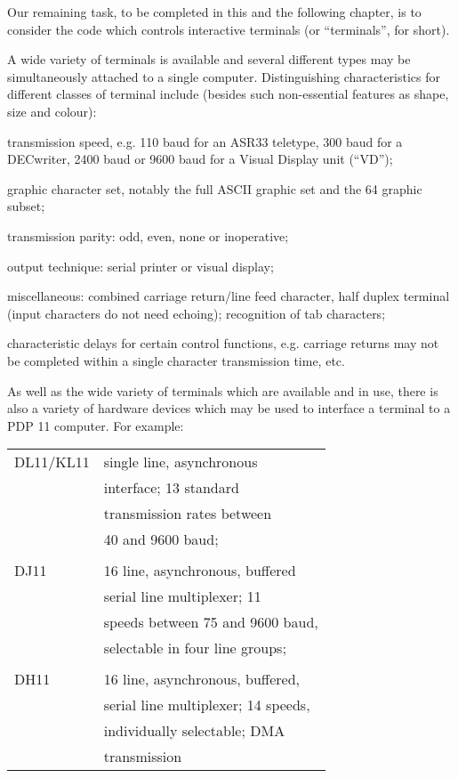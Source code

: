 %
%

Our remaining task, to be completed in
this and the following chapter, is to
consider the code which controls
interactive terminals (or ``terminals'',
for short).

A wide variety of terminals is available and several different types may be
simultaneously attached to a single
computer. Distinguishing characteristics for different classes of terminal
include (besides such non-essential
features as shape, size and colour):

\bd
\item[(a)] transmission speed, e.g. 110
baud for an ASR33 teletype, 300
baud for a DECwriter, 2400 baud
or 9600 baud for a Visual
Display unit (``VD'');

\item[(b)] graphic character set, notably
the full ASCII graphic set and
the 64 graphic subset;

\item[(c)] transmission parity: odd, even,
none or inoperative;

\item[(d)] output technique:  serial printer
or visual display;

\item[(e)] miscellaneous: combined carriage
return/line feed character, half
duplex terminal (input characters do not need echoing);
recognition of tab characters;

\item[(f)] characteristic delays for certain control functions, e.g.
carriage returns may not be completed within a single character
transmission time, etc.
\ed

As well as the wide variety of terminals which are available and in use,
there is also a variety of hardware
devices which may be used to interface
a terminal to a PDP 11 computer. For example:

\noindent\begin{tabular}{ll}\\
DL11/KL11 & single line, asynchronous\\
	  & interface; 13 standard\\
	  & transmission rates between\\
	  & 40 and 9600 baud;\\
\\
DJ11 & 16 line, asynchronous, buffered\\
	& serial line multiplexer; 11\\
	& speeds between 75 and 9600 baud,\\
	& selectable in four line groups;\\
\\
DH11 & 16 line, asynchronous, buffered,\\
	&  serial line multiplexer; 14 speeds,\\
	& individually selectable; DMA \\
	& transmission\\
\end{tabular}

